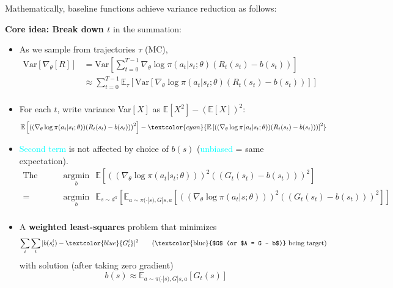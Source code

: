 \documentclass{article}
\begin{document}
Mathematically, baseline functions achieve variance reduction as follows:
\begin{prfbox}
    \textbf{Core idea: Break down $t$} in the summation:
    \begin{itemize}
    \item As we sample from trajectories $\tau$ (MC),
        $\begin{aligned}
            \text{Var}[ \nabla_{\theta} [R]] & 
            = \text{Var}[ \sum_{t = 0}^{T-1} \nabla_{\theta} \log \pi(a_t | s_t; \theta) (R_t (s_t) - b(s_t))]\\ & 
            \approx \sum_{t = 0}^{T-1} \mathbb{E}_{\tau} \left[ \text{Var}[\nabla_{\theta} \log \pi(a_t|s_t ; \theta) (R_t(s_t) - b(s_t))] \right]\\
        \end{aligned}$
    \item For each $t$, write variance Var$[X]$ as $\mathbb{E}[X^2] - (\mathbb{E}[X])^2$:
        \begin{equation*}
            \mathbb{E}\left[\left((\nabla_{\theta} \log \pi(a_t | s_t ; \theta)) (R_t(s_t) - b(s_t)) \right)^2 \right]
            - \textcolor{cyan}{\mathbb{E}\left[\left((\nabla_{\theta} \log \pi(a_t | s_t ; \theta)) (R_t(s_t) - b(s_t)) \right) \right]^2}
        \end{equation*}
    \item \textcolor{cyan}{Second term} is not affected by choice of $b(s)$ (\textcolor{cyan}{unbiased} = same expectation). 
    \\
        $\begin{aligned}
            \text{The variance equals} & 
            \mathop{\arg\min}\limits_{b} ~~\mathbb{E}\left[\left((\nabla_{\theta} \log \pi(a_t | s_t ; \theta))\right)^2 \left((G_t(s_t) - b(s_t)) \right)^2 \right]\\ 
            = & \mathop{\arg\min}\limits_{b} ~~\mathbb{E}_{s \sim d^{\pi}}\left[ \mathbb{E}_{a \sim \pi(\cdot | s), G | s, a} \left[ \left((\nabla_{\theta} \log \pi(a_t | s ; \theta))\right)^2 \left((G_t(s_t) - b(s_t)) \right)^2 \right] \right]\\
        \end{aligned}$
    \item A \textbf{weighted least-squares} problem that minimizes
        \begin{equation*}
            \sum_{i} \sum_{t} |b(s^{i}_{t}) - \textcolor{blue}{G^{i}_{t}}|^2 \quad\quad \text{(\textcolor{blue}{$G$ (or $A = G - b$)} being target)}
        \end{equation*}            
        with solution (after taking zero gradient)
        \begin{equation*}
            b(s) \approx \mathbb{E}_{a \sim \pi(\cdot | s), G | s, a} [G_t (s)]
        \end{equation*}
    \end{itemize}
\end{prfbox}
\end{document}
